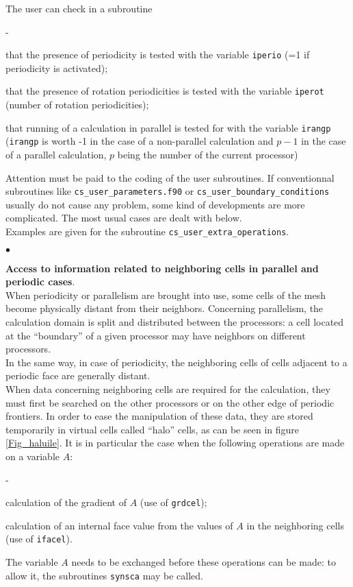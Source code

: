 {{{The user can check in a subroutine
\begin{list}{-}{}
\item that the presence of periodicity is tested with the variable
      \texttt{iperio} (=1 if periodicity is activated);
\item that the presence of rotation periodicities is tested with the variable
      \texttt{iperot} (number of rotation periodicities);
\item that running of a calculation in parallel is tested for with the
      variable \texttt{irangp} (\texttt{irangp} is worth -1 in the case of a
      non-parallel calculation and $p-1$ in the case of a parallel calculation,
      $p$ being the number of the current processor)
\end{list}
Attention must be paid to the coding of the user subroutines. If
conventionnal subroutines like \texttt{cs\_user\_parameters.f90} or \texttt{cs\_user\_boundary\_conditions}
usually do not cause any problem, some kind of developments are more
complicated. The most usual cases are dealt with below. \\ Examples are
given for the subroutine \texttt{cs\_user\_extra\_operations}.
\begin{list}{$\bullet$}{}
\item {\bf Access to information related to neighboring cells in
      parallel and periodic cases}.\\
When periodicity or parallelism are brought into use, some cells of the
      mesh become physically distant from their neighbors. Concerning
      parallelism, the calculation domain is split and distributed
      between the processors: a cell located at the ``boundary'' of a
      given processor may have neighbors on different processors. \\
In the same way, in case of periodicity, the neighboring cells of cells
      adjacent to a periodic face are generally distant. \\
When data concerning neighboring cells are required for the
      calculation, they must first be searched on the other processors
      or on the other edge of periodic frontiers. In order to ease the
      manipulation of these data, they are stored temporarily in virtual
      cells called ``halo'' cells, as can be seen in figure \ref{Fig_haluile}.
It is in particular the case when the following operations are made on a
      variable $A$:
\begin{list}{-}{}
\item calculation of the gradient of $A$ (use of \texttt{grdcel});
\item calculation of an internal face value from the values of $A$  in
      the neighboring cells (use of \texttt{ifacel}).
\end{list}
The variable $A$ needs to be exchanged before these operations can be
      made: to allow it, the subroutines \texttt{synsca} may be called.


\end{list}}}}
